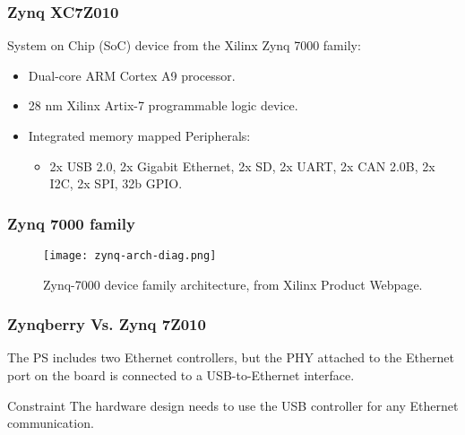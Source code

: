 \begin{frame}
	\frametitle{Zynq XC7Z010}
	System on Chip (SoC) device from the Xilinx Zynq 7000 family:
	\begin{itemize}
		\item Dual-core ARM Cortex A9 processor. \pause
		\item 28 nm Xilinx Artix-7 programmable logic device. \pause
		\item Integrated memory mapped Peripherals:
		\begin{itemize}
			\item 2x USB 2.0, 2x Gigabit Ethernet, 2x SD, 2x UART, 2x CAN 2.0B, 2x I2C, 2x SPI, 32b GPIO.
		\end{itemize}
	\end{itemize}
\end{frame}

\begin{frame}
	\frametitle{Zynq 7000 family}
	\begin{figure}
		\texttt{[image: zynq-arch-diag.png]}
		\caption{Zynq-7000 device family architecture, from Xilinx Product Webpage.} \label{fig:zynq-arch-diag}
	\end{figure}
\end{frame}

\begin{frame}
	\frametitle{Zynqberry Vs. Zynq 7Z010}
	The PS includes two Ethernet controllers, but the PHY attached to the Ethernet port on the board is connected to a USB-to-Ethernet interface.
	\vfill \pause
	\begin{alertblock}{Constraint}
		The hardware design needs to use the USB controller for any Ethernet communication.
	\end{alertblock}
\end{frame}